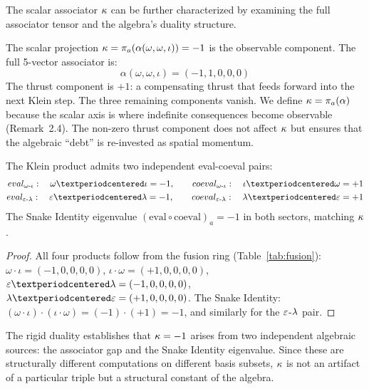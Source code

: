 The scalar associator $\kappa$ can be further characterized by examining the full associator tensor and the algebra's duality structure.

\begin{remark}
The scalar projection $\kappa = \pi_a(\alpha(\omega, \omega, \iota)) = -1$ is the observable component. The full 5-vector associator is:
$$\alpha(\omega, \omega, \iota) = (-1, 1, 0, 0, 0)$$
The thrust component is $+1$: a compensating thrust that feeds forward into the next Klein step. The three remaining components vanish. We define $\kappa = \pi_a(\alpha)$ because the scalar axis is where indefinite consequences become observable (Remark~2.4). The non-zero thrust component does not affect $\kappa$ but ensures that the algebraic ``debt'' is re-invested as spatial momentum.
\end{remark}

\begin{theorem}\label{thm:rigidity}
The Klein product admits two independent eval-coeval pairs:
\begin{align}
\mathrm{eval}_{\omega\text{-}\iota}: \quad \omega \cdot \iota = -1, \qquad
\mathrm{coeval}_{\omega\text{-}\iota}: \quad \iota \cdot \omega = +1 \\
\mathrm{eval}_{\eps\text{-}\lam}: \quad \eps \cdot \lam = -1, \qquad
\mathrm{coeval}_{\eps\text{-}\lam}: \quad \lam \cdot \eps = +1
\end{align}
The Snake Identity eigenvalue $(\mathrm{eval} \circ \mathrm{coeval})_a = -1$ in both sectors, matching $\kappa$.
\end{theorem}

\begin{proof}
All four products follow from the fusion ring (Table~\ref{tab:fusion}): $\omega \cdot \iota = (-1,0,0,0,0)$, $\iota \cdot \omega = (+1,0,0,0,0)$, $\eps \cdot \lam = (-1,0,0,0,0)$, $\lam \cdot \eps = (+1,0,0,0,0)$. The Snake Identity: $(\omega \cdot \iota) \cdot (\iota \cdot \omega) = (-1) \cdot (+1) = -1$, and similarly for the $\varepsilon$-$\lambda$ pair. \qedhere
\end{proof}

\begin{remark}
The rigid duality establishes that $\kappa = -1$ arises from two independent algebraic sources: the associator gap and the Snake Identity eigenvalue. Since these are structurally different computations on different basis subsets, $\kappa$ is not an artifact of a particular triple but a structural constant of the algebra.
\end{remark}

